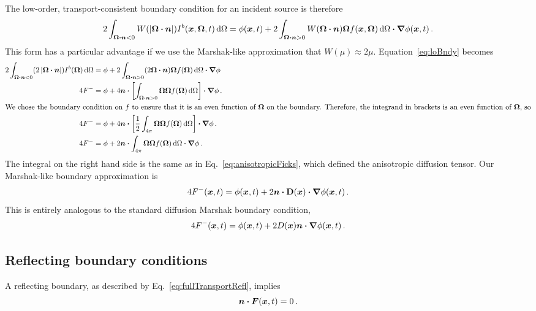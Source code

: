 The low-order, transport-consistent boundary condition for an incident source
is therefore
\begin{equation}\label{eq:loBndy}
  2\int_{\bm{\Omega}\bm{\cdot} \bm{n} < 0}
  W(\left| \bm{\Omega} \bm{\cdot} \bm{n} \right|) I^b(\bm{x}, \bm{\Omega}, t) \mathop{}\!\mathrm{d}\Omega
  = \phi(\bm{x}, t)
  + 2\int_{\bm{\Omega}\bm{\cdot} \bm{n} > 0} W(\bm{\Omega} \bm{\cdot} \bm{n})
  \bm{\Omega} f(\bm{x}, \bm{\Omega}) \mathop{}\!\mathrm{d}\Omega
  \bm{\cdot} \bm{\nabla} \phi(\bm{x}, t) \,.
\end{equation}
This form has a particular advantage if we use the Marshak-like approximation
that $W(\mu)\approx 2\mu$. Equation~\eqref{eq:loBndy} becomes
\begin{align*}
  2\int_{\bm{\Omega}\bm{\cdot} \bm{n} < 0}
  ( 2\left| \bm{\Omega} \bm{\cdot} \bm{n} \right| ) I^b(\bm{\Omega}) \mathop{}\!\mathrm{d}\Omega
  &= \phi
  + 2\int_{\bm{\Omega}\bm{\cdot} \bm{n} > 0} ( 2\bm{\Omega} \bm{\cdot} \bm{n} )
  \bm{\Omega} f(\bm{\Omega}) \mathop{}\!\mathrm{d}\Omega \bm{\cdot} \bm{\nabla} \phi
  \\
  4 F^-
  &= \phi
  + 4 \bm{n} \bm{\cdot} \left[ \int_{\bm{\Omega}\bm{\cdot} \bm{n} > 0} \bm{\Omega}
  \bm{\Omega} f(\bm{\Omega}) \mathop{}\!\mathrm{d}\Omega \right] \bm{\cdot} \bm{\nabla} \phi \,.
  \\ 
  \intertext{We chose the boundary condition on $f$ to ensure that it is an
  even function of $\bm{\Omega}$ on the boundary. Therefore, the integrand in
  brackets is an even function of $\bm{\Omega}$, so}
  4 F^-
  &= \phi
  + 4 \bm{n} \bm{\cdot}  \left[ \frac{1}{2} \int_{4\pi}
  \bm{\Omega} \bm{\Omega} f(\bm{\Omega}) \mathop{}\!\mathrm{d}\Omega \right] \bm{\cdot} \bm{\nabla} \phi \,.
  \\
  4 F^-
  &= \phi
  + 2 \bm{n} \bm{\cdot} \int_{4\pi}
  \bm{\Omega} \bm{\Omega} f(\bm{\Omega}) \mathop{}\!\mathrm{d}\Omega \bm{\cdot} \bm{\nabla} \phi \,.
\end{align*}
The integral on the right hand side is the same as in
  Eq.~\eqref{eq:anisotropicFicks}, which defined the anisotropic diffusion
  tensor. Our Marshak-like boundary approximation is
\begin{equation}\label{eq:marshakAd}
  4 F^-(\bm{x}, t)
  = \phi(\bm{x}, t)
  + 2 \bm{n} \bm{\cdot} \mathbf{D}(\bm{x}) \bm{\cdot} \bm{\nabla} \phi(\bm{x}, t) \,.
\end{equation}
This is entirely analogous to the standard diffusion Marshak boundary condition,
\begin{equation*}
  4 F^-(\bm{x}, t) = \phi(\bm{x}, t)
  + 2  D(\bm{x}) \bm{n} \bm{\cdot} \bm{\nabla} \phi(\bm{x}, t)\,.
\end{equation*}

\subsection{Reflecting boundary conditions}
A reflecting boundary, as described by Eq.~\eqref{eq:fullTransportRefl}, 
implies
\begin{equation}\label{eq:reflFirst}
  \bm{n} \bm{\cdot} \bm{F}(\bm{x}, t) = 0\,.
\end{equation}

